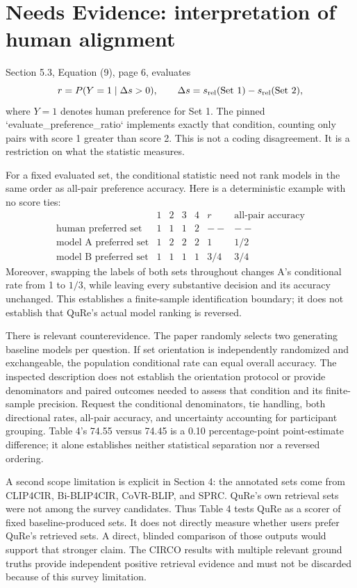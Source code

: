 \documentclass[10pt]{article}
\begin{document}
\section*{Needs Evidence: interpretation of human alignment}
Section 5.3, Equation (9), page 6, evaluates \[r=P(Y=1\mid \Delta s>0),\qquad
 \Delta s=s_{\rm rel}({\rm Set}\ 1)-s_{\rm rel}({\rm Set}\ 2),\] where \(Y=1\) denotes human preference for Set 1. The pinned `evaluate\_preference\_ratio` implements exactly that condition, counting only pairs with score 1 greater than score 2. This is not a coding disagreement. It is a restriction on what the statistic measures.\par
For a fixed evaluated set, the conditional statistic need not rank models in the same order as all-pair preference accuracy. Here is a deterministic example with no score ties: \[\begin{array}{c|cccc|cc}
 &1&2&3&4&r&\text{all-pair accuracy}\\ \hline
 \text{human preferred set}&1&1&1&2&--&--\\
 \text{model A preferred set}&1&2&2&2&1&1/2\\
 \text{model B preferred set}&1&1&1&1&3/4&3/4
\end{array}\] Moreover, swapping the labels of both sets throughout changes A’s conditional rate from 1 to \(1/3\), while leaving every substantive decision and its accuracy unchanged. This establishes a finite-sample identification boundary; it does not establish that QuRe’s actual model ranking is reversed.\par
There is relevant counterevidence. The paper randomly selects two generating baseline models per question. If set orientation is independently randomized and exchangeable, the population conditional rate can equal overall accuracy. The inspected description does not establish the orientation protocol or provide denominators and paired outcomes needed to assess that condition and its finite-sample precision. Request the conditional denominators, tie handling, both directional rates, all-pair accuracy, and uncertainty accounting for participant grouping. Table 4’s 74.55 versus 74.45 is a 0.10 percentage-point point-estimate difference; it alone establishes neither statistical separation nor a reversed ordering.\par
A second scope limitation is explicit in Section 4: the annotated sets come from CLIP4CIR, Bi-BLIP4CIR, CoVR-BLIP, and SPRC. QuRe’s own retrieval sets were not among the survey candidates. Thus Table 4 tests QuRe as a scorer of fixed baseline-produced sets. It does not directly measure whether users prefer QuRe’s retrieved sets. A direct, blinded comparison of those outputs would support that stronger claim. The CIRCO results with multiple relevant ground truths provide independent positive retrieval evidence and must not be discarded because of this survey limitation.\par
\end{document}
